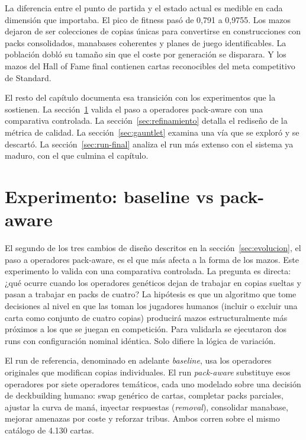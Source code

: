 La diferencia entre el punto de partida y el estado actual es medible en cada dimensión que importaba. El pico de fitness pasó de 0,791 a 0,9755. Los mazos dejaron de ser colecciones de copias únicas para convertirse en construcciones con packs consolidados, manabases coherentes y planes de juego identificables. La población dobló su tamaño sin que el coste por generación se disparara. Y los mazos del Hall of Fame final contienen cartas reconocibles del meta competitivo de Standard.

El resto del capítulo documenta esa transición con los experimentos que la sostienen. La sección~\ref{sec:experimento-ab} valida el paso a operadores pack-aware con una comparativa controlada. La sección~\ref{sec:refinamiento} detalla el rediseño de la métrica de calidad. La sección~\ref{sec:gauntlet} examina una vía que se exploró y se descartó. La sección~\ref{sec:run-final} analiza el run más extenso con el sistema ya maduro, con el que culmina el capítulo.

\section{Experimento: baseline vs pack-aware}
\label{sec:experimento-ab}

El segundo de los tres cambios de diseño descritos en la sección~\ref{sec:evolucion}, el paso a operadores pack-aware, es el que más afecta a la forma de los mazos. Este experimento lo valida con una comparativa controlada. La pregunta es directa: ¿qué ocurre cuando los operadores genéticos dejan de trabajar en copias sueltas y pasan a trabajar en packs de cuatro? La hipótesis es que un algoritmo que tome decisiones al nivel en que las toman los jugadores humanos (incluir o excluir una carta como conjunto de cuatro copias) producirá mazos estructuralmente más próximos a los que se juegan en competición. Para validarla se ejecutaron dos runs con configuración nominal idéntica. Solo difiere la lógica de variación.

El run de referencia, denominado en adelante \emph{baseline}, usa los operadores originales que modifican copias individuales. El run \emph{pack-aware} substituye esos operadores por siete operadores temáticos, cada uno modelado sobre una decisión de deckbuilding humano: swap genérico de cartas, completar packs parciales, ajustar la curva de maná, inyectar respuestas (\emph{removal}), consolidar manabase, mejorar amenazas por coste y reforzar tribus. Ambos corren sobre el mismo catálogo de 4.130 cartas.

